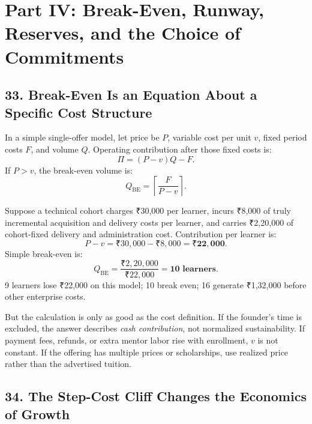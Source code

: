 \section*{Part IV: Break-Even, Runway, Reserves, and the Choice of Commitments}

\subsection*{33. Break-Even Is an Equation About a Specific Cost Structure}

In a simple single-offer model, let price be $P$, variable cost per unit $v$, fixed period costs $F$, and volume $Q$. Operating contribution after those fixed costs is:
\begin{equation}
\Pi = (P - v)Q - F.
\end{equation}
If $P > v$, the break-even volume is:
\begin{equation}
Q_{\text{BE}} = \left\lceil \frac{F}{P - v} \right\rceil.
\end{equation}

Suppose a technical cohort charges ₹30,000 per learner, incurs ₹8,000 of truly incremental acquisition and delivery costs per learner, and carries ₹2,20,000 of cohort-fixed delivery and administration cost. Contribution per learner is:
\begin{equation}
P - v = ₹30,000 - ₹8,000 = \mathbf{₹22,000}.
\end{equation}
Simple break-even is:
\begin{equation}
Q_{\text{BE}} = \frac{₹2,20,000}{₹22,000} = \mathbf{10\text{ learners}}.
\end{equation}
9 learners lose ₹22,000 on this model; 10 break even; 16 generate ₹1,32,000 before other enterprise costs.

But the calculation is only as good as the cost definition. If the founder's time is excluded, the answer describes \emph{cash contribution}, not normalized sustainability. If payment fees, refunds, or extra mentor labor rise with enrollment, $v$ is not constant. If the offering has multiple prices or scholarships, use realized price rather than the advertised tuition.

\subsection*{34. The Step-Cost Cliff Changes the Economics of Growth}

